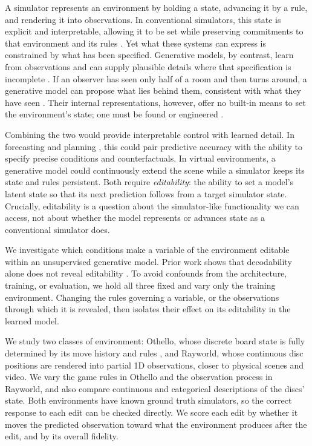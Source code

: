\documentclass{article} %
\begin{document}
A simulator represents an environment by holding a state, advancing it by a rule, and rendering it into observations. In conventional simulators, this state is explicit and interpretable, allowing it to be set while preserving commitments to that environment and its rules \citep{todorov2012mujoco}. Yet what these systems can express is constrained by what has been specified. Generative models, by contrast, learn from observations and can supply plausible details where that specification is incomplete \citep{brooks2024sora,bruce2024genie}. If an observer has seen only half of a room and then turns around, a generative model can propose what lies behind them, consistent with what they have seen \citep{lu2025genex}. Their internal representations, however, offer no built-in means to set the environment's state; one must be found or engineered \citep{shen2020interfacegan,tewari2020stylerig}.

Combining the two would provide interpretable control with learned detail. In forecasting \citep{lam2023graphcast} and planning \citep{hafner2025dreamerv3}, this could pair predictive accuracy with the ability to specify precise conditions and counterfactuals. In virtual environments, a generative model could continuously extend the scene while a simulator keeps its state and rules persistent. Both require \textit{editability}: the ability to set a model's latent state so that its next prediction follows from a target simulator state. Crucially, editability is a question about the simulator-like functionality we can access, not about whether the model represents or advances state as a conventional simulator does.

We investigate which conditions make a variable of the environment editable within an unsupervised generative model. Prior work shows that decodability alone does not reveal editability \citep{hazineh2023linear}. To avoid confounds from the architecture, training, or evaluation, we hold all three fixed and vary only the training environment. Changing the rules governing a variable, or the observations through which it is revealed, then isolates their effect on its editability in the learned model. 

We study two classes of environment: Othello, whose discrete board state is fully determined by its move history and rules \citep{li2023othello}, and Rayworld, whose continuous disc positions are rendered into partial 1D observations, closer to physical scenes and video. We vary the game rules in Othello and the observation process in Rayworld, and also compare continuous and categorical descriptions of the discs' state. Both environments have known ground truth simulators, so the correct response to each edit can be checked directly. We score each edit by whether it moves the predicted observation toward what the environment produces after the edit, and by its overall fidelity.
\end{document}
